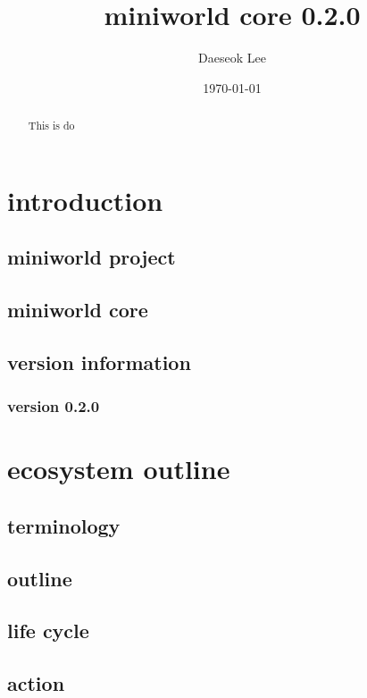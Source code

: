 \documentclass{amsart}
\theoremstyle{definition}
\theoremstyle{remark}
\numberwithin{equation}{section}
\begin{document}
\title{miniworld core 0.2.0}
\date{\today}
\author{Daeseok Lee}
\begin{abstract}
This is do
\end{abstract}
\maketitle
\section{introduction}
\subsection{miniworld project}


\subsection{miniworld core} 


\subsection{version information} 
\subsubsection{version 0.2.0}


\section{ecosystem outline}
\subsection{terminology}


\subsection{outline}


\subsection{life cycle} 


\subsection{action}
\end{document}
